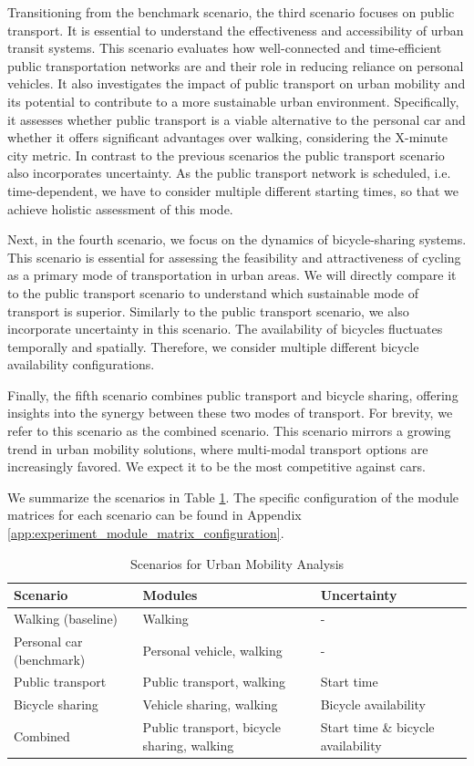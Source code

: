 Transitioning from the benchmark scenario, the third scenario focuses on public transport. 
It is essential to understand the effectiveness and accessibility of urban transit systems. 
This scenario evaluates how well-connected and time-efficient public transportation networks are and their role in reducing reliance on personal vehicles. 
It also investigates the impact of public transport on urban mobility and its potential to contribute to a more sustainable urban environment. 
Specifically, it assesses whether public transport is a viable alternative to the personal car and whether it offers significant advantages over walking, considering the X-minute city metric.
In contrast to the previous scenarios the public transport scenario also incorporates uncertainty.
As the public transport network is scheduled, i.e. time-dependent, we have to consider multiple different starting times, so that we achieve holistic assessment of this mode.

Next, in the fourth scenario, we focus on the dynamics of bicycle-sharing systems. 
This scenario is essential for assessing the feasibility and attractiveness of cycling as a primary mode of transportation in urban areas. 
We will directly compare it to the public transport scenario to understand which sustainable mode of transport is superior.
Similarly to the public transport scenario, we also incorporate uncertainty in this scenario.
The availability of bicycles fluctuates temporally and spatially.
Therefore, we consider multiple different bicycle availability configurations.

Finally, the fifth scenario combines public transport and bicycle sharing, offering insights into the synergy between these two modes of transport.
For brevity, we refer to this scenario as the combined scenario.
This scenario mirrors a growing trend in urban mobility solutions, where multi-modal transport options are increasingly favored. 
We expect it to be the most competitive against cars.

We summarize the scenarios in Table \ref{table:scenarios}.
The specific configuration of the module matrices for each scenario can be found in Appendix \ref{app:experiment_module_matrix_configuration}.

\begin{table}[h]
\centering
\begin{tabular}{|p{4cm}|p{5cm}|p{4cm}|}
\hline
\textbf{Scenario} & \textbf{Modules} & \textbf{Uncertainty} \\
\hline
Walking (baseline) & Walking & - \\
\hline
Personal car (benchmark) & Personal vehicle, walking & - \\
\hline
Public transport & Public transport, walking & Start time \\
\hline
Bicycle sharing & Vehicle sharing, walking & Bicycle availability \\
\hline
Combined & Public transport, bicycle sharing, walking & Start time \& bicycle availability \\
\hline
\end{tabular}
\caption{Scenarios for Urban Mobility Analysis}
\label{table:scenarios}
\end{table}


